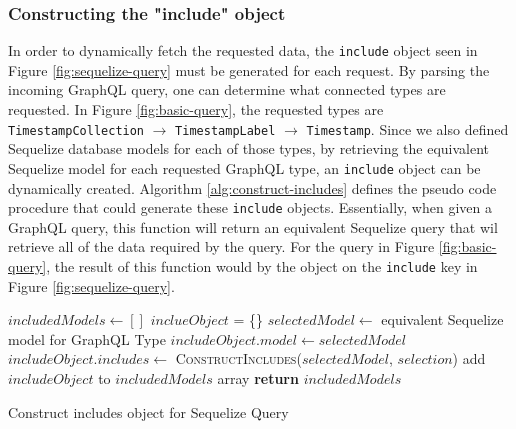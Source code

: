 \subsubsection{Constructing the "include" object}
In order to dynamically fetch the requested data, the \verb!include! object seen in Figure \ref{fig:sequelize-query} must be generated for each request.  By parsing the incoming GraphQL query, one can determine what connected types are requested.  In Figure \ref{fig:basic-query}, the requested types are \verb!TimestampCollection! $\rightarrow$ \verb!TimestampLabel! $\rightarrow$ \Verb!Timestamp!.  Since we also defined Sequelize database models for each of those types, by retrieving the equivalent Sequelize model for each requested GraphQL type, an \verb!include! object can be dynamically created. Algorithm \ref{alg:construct-includes} defines the pseudo code procedure that could generate these \verb!include! objects.  Essentially, when given a GraphQL query, this function will return an equivalent Sequelize query that wil retrieve all of the data required by the query. For the query in Figure \ref{fig:basic-query}, the result of this function would by the object on the \verb!include! key in Figure \ref{fig:sequelize-query}.

\begin{algorithm}[H]
    \begin{algorithmic}
            \State $includedModels \leftarrow []$
                \State $inclueObject$ = \{\}
                    \State $selectedModel \leftarrow$ equivalent Sequelize model for GraphQL Type
                    \State $includeObject.model \leftarrow selectedModel$
                    \State $includeObject.includes \leftarrow$ 
                    \State \textsc{  ConstructIncludes}($selectedModel$, $selection$)
                    \State add $includeObject$ to $includedModels$ array
                \EndIf
            \EndFor
            \State \textbf{return} $includedModels$
        \EndProcedure
    \end{algorithmic}
    \caption{Construct includes object for Sequelize Query}
    \label{alg:construct-includes}
\end{algorithm}
